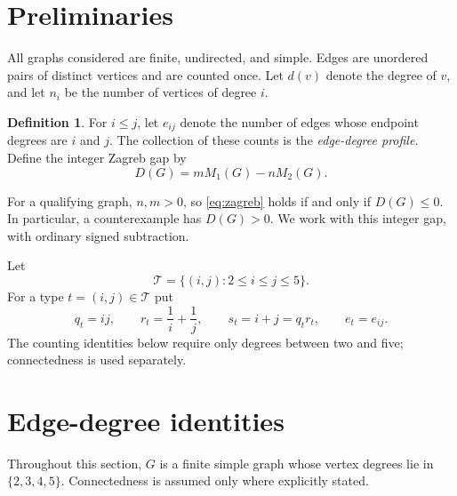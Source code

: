 \documentclass[11pt]{amsart}
\theoremstyle{definition}
\newtheorem{definition}[theorem]{Definition}
\theoremstyle{remark}
\newcommand{\T}{\mathcal T}
\begin{document}
\section{Preliminaries}\label{sec:prelim}
All graphs considered are finite, undirected, and simple. Edges are unordered pairs of distinct vertices and are counted once. Let $d(v)$ denote the degree of $v$, and let $n_i$ be the number of vertices of degree $i$.

\begin{definition}\label{def:profile}
For $i\le j$, let $e_{ij}$ denote the number of edges whose endpoint degrees are $i$ and $j$. The collection of these counts is the \emph{edge-degree profile}. Define the integer Zagreb gap by
\begin{equation}\label{eq:gapdef}
 D(G)=mM_1(G)-nM_2(G).
\end{equation}
\end{definition}
For a qualifying graph, $n,m>0$, so \eqref{eq:zagreb} holds if and only if $D(G)\le0$. In particular, a counterexample has $D(G)>0$. We work with this integer gap, with ordinary signed subtraction.

Let
\[
 \T=\{(i,j):2\le i\le j\le5\}.
\]
For a type $t=(i,j)\in\T$ put
\begin{equation}\label{eq:weights}
 q_t=ij,\qquad r_t=\frac1i+\frac1j,\qquad s_t=i+j=q_tr_t,
 \qquad e_t=e_{ij}.
\end{equation}
The counting identities below require only degrees between two and five; connectedness is used separately.

\section{Edge-degree identities}\label{sec:identities}
Throughout this section, $G$ is a finite simple graph whose vertex degrees lie in $\{2,3,4,5\}$. Connectedness is assumed only where explicitly stated.
\end{document}
